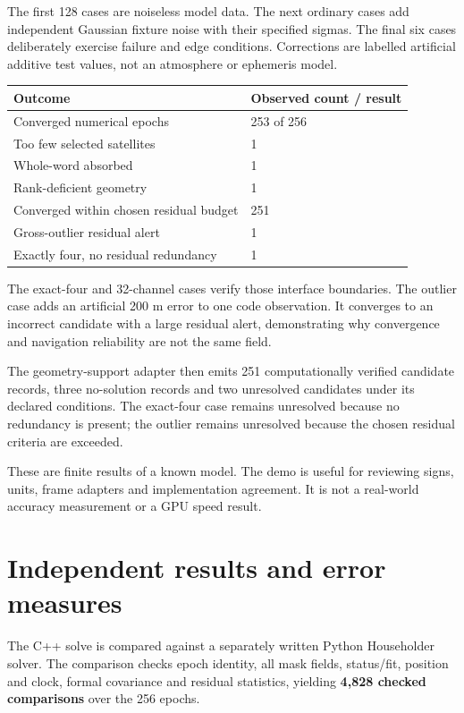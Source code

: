 \documentclass[11pt,a4paper]{article}
\begin{document}
The first 128 cases are noiseless model data. The next ordinary cases add independent
Gaussian fixture noise with their specified sigmas. The final six cases deliberately
exercise failure and edge conditions. Corrections are labelled artificial additive
test values, not an atmosphere or ephemeris model.

\begin{center}
\begin{tabularx}{\textwidth}{@{}P{.42\textwidth}Y@{}}\toprule
\textbf{Outcome} & \textbf{Observed count / result}\\\midrule
Converged numerical epochs & 253 of 256\\
Too few selected satellites & 1\\
Whole-word absorbed & 1\\
Rank-deficient geometry & 1\\
Converged within chosen residual budget & 251\\
Gross-outlier residual alert & 1\\
Exactly four, no residual redundancy & 1\\\bottomrule
\end{tabularx}
\end{center}

The exact-four and 32-channel cases verify those interface boundaries. The outlier
case adds an artificial 200 m error to one code observation. It converges to an
incorrect candidate with a large residual alert, demonstrating why convergence and
navigation reliability are not the same field.

The geometry-support adapter then emits 251 computationally verified candidate
records, three no-solution records and two unresolved candidates under its declared
conditions. The exact-four case remains unresolved because no redundancy is present;
the outlier remains unresolved because the chosen residual criteria are exceeded.

These are finite results of a known model. The demo is useful for reviewing signs,
units, frame adapters and implementation agreement. It is not a real-world accuracy
measurement or a GPU speed result.
\clearpage

\section{Independent results and error measures}
The C++ solve is compared against a separately written Python Householder solver.
The comparison checks epoch identity, all mask fields, status/fit, position and clock,
formal covariance and residual statistics, yielding \textbf{4,828 checked comparisons}
over the 256 epochs.
\end{document}
